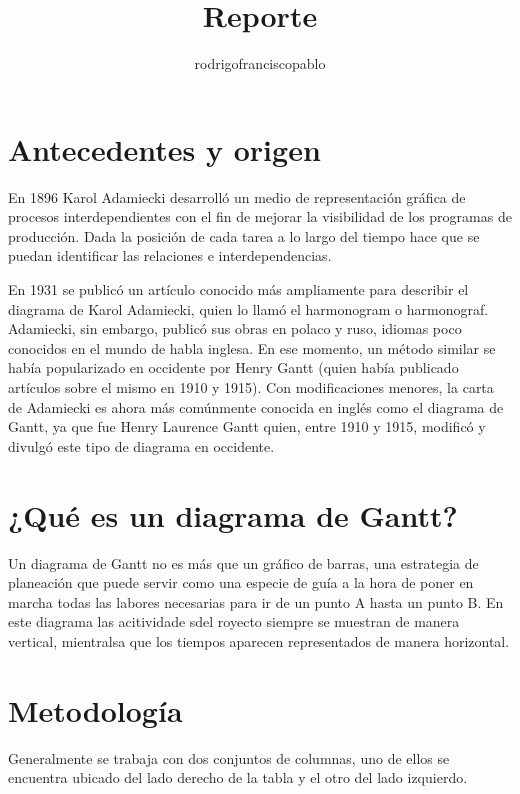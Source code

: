 \documentclass{mylib/reporteCorto}
\title{Reporte}
\author{rodrigofranciscopablo }
\begin{document}
\coverPage


\tableofcontents

\section{Antecedentes y origen}

En 1896 Karol Adamiecki desarrolló un medio de representación gráfica de procesos interdependientes con el fin de mejorar la visibilidad de los programas de producción. Dada la posición de cada tarea a lo largo del tiempo hace que se puedan identificar las relaciones e interdependencias.

En 1931 se publicó un artículo conocido más ampliamente para describir el diagrama de Karol Adamiecki, quien lo llamó el harmonogram o harmonograf. Adamiecki, sin embargo, publicó sus obras en polaco y ruso, idiomas poco conocidos en el mundo de habla inglesa. En ese momento, un método similar se había popularizado en occidente por Henry Gantt (quien había publicado artículos sobre el mismo en 1910 y 1915). Con modificaciones menores, la carta de Adamiecki es ahora más comúnmente conocida en inglés como el diagrama de Gantt, ya que fue Henry Laurence Gantt quien, entre 1910 y 1915, modificó y divulgó este tipo de diagrama en occidente.

\section{¿Qué es un diagrama de Gantt?}

Un diagrama de Gantt no es más que un gráfico de barras, una estrategia de planeación que puede servir como una especie de guía a la hora de poner en marcha todas las labores necesarias para ir de un punto A hasta un punto B. En este diagrama las acitividade sdel royecto siempre se muestran de manera vertical, mientralsa que los tiempos aparecen representados de manera horizontal.


\section{Metodología}

Generalmente se trabaja con dos conjuntos de columnas, uno de ellos se encuentra ubicado del lado derecho de la tabla y el otro del lado izquierdo.
\end{document}
